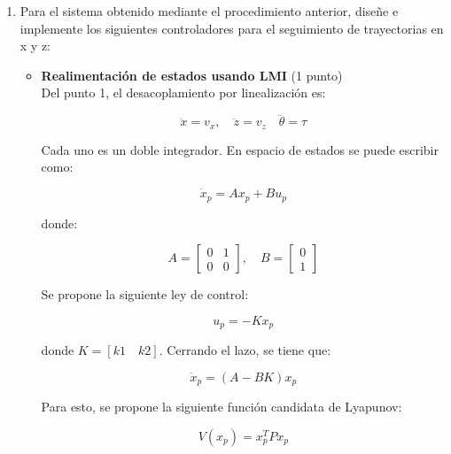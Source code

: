 \begin{enumerate}
    \item Para el sistema obtenido mediante el procedimiento anterior, diseñe e implemente los siguientes controladores para
el seguimiento de trayectorias en x y z:
    \begin{itemize}
        \item \textbf{Realimentación de estados usando LMI} (1 punto)\\
        
        Del punto 1, el desacoplamiento por linealización es:

        \begin{equation*}
            \ddot{x}=v_x,\quad \ddot{z}=v_z \quad \ddot{\theta}=\tau
        \end{equation*}
        
        Cada uno es un doble integrador. En espacio de estados se puede escribir como:

        \begin{equation*}
            \dot{x}_p=Ax_p+Bu_p
        \end{equation*}

        donde:

        \begin{equation*}
            A=\begin{bmatrix}
                0 & 1\\
                0 & 0
            \end{bmatrix},\quad B=\begin{bmatrix}
                0\\
                1
            \end{bmatrix}
        \end{equation*}

        Se propone la siguiente ley de control:

        \begin{equation*}
            u_p=-Kx_p
        \end{equation*}

        donde \(K=[k1\quad k2]\). Cerrando el lazo, se tiene que:

        \begin{equation*}
            \dot{x}_p=(A-BK)x_p
        \end{equation*}

        Para esto, se propone la siguiente función candidata de Lyapunov:

        \begin{equation*}
            V(x_p)=x_p^TPx_p
        \end{equation*}


\end{itemize}
\end{enumerate}
